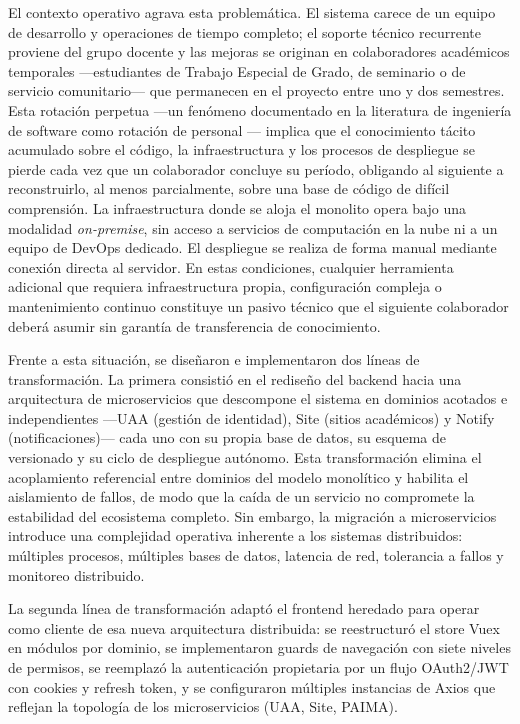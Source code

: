 El contexto operativo agrava esta problem\'{a}tica. El sistema carece de un equipo
de desarrollo y operaciones de tiempo completo; el soporte t\'{e}cnico recurrente
proviene del grupo docente y las mejoras se originan en colaboradores acad\'{e}micos
temporales ---estudiantes de Trabajo Especial de Grado, de seminario o de servicio
comunitario--- que permanecen en el proyecto entre uno y dos semestres. Esta
rotaci\'{o}n perpetua ---un fen\'{o}meno documentado en la literatura de ingenier\'{i}a de
software como rotaci\'{o}n de personal \cite{santos2016jobrotation}--- implica que el
conocimiento t\'{a}cito acumulado sobre el c\'{o}digo, la infraestructura y los procesos
de despliegue se pierde cada vez que un colaborador concluye su per\'{i}odo,
obligando al siguiente a reconstruirlo, al menos parcialmente, sobre una base de c\'{o}digo de
dif\'{i}cil comprensi\'{o}n. La infraestructura donde
se aloja el monolito opera bajo una modalidad \textit{on-premise}, sin acceso a
servicios de computaci\'{o}n en la nube ni a un equipo de DevOps dedicado. El
despliegue se realiza de forma manual mediante conexi\'{o}n directa al servidor. En
estas condiciones, cualquier herramienta adicional que requiera infraestructura
propia, configuraci\'{o}n compleja o mantenimiento continuo constituye un pasivo
t\'{e}cnico que el siguiente colaborador deber\'{a} asumir sin garant\'{i}a de
transferencia de conocimiento.

Frente a esta situaci\'{o}n, se dise\~{n}aron e implementaron dos l\'{i}neas de
transformaci\'{o}n. La primera consisti\'{o} en el redise\~{n}o del backend hacia una
arquitectura de microservicios que descompone el sistema en dominios acotados e
independientes ---UAA (gesti\'{o}n de identidad), Site (sitios acad\'{e}micos) y
Notify (notificaciones)--- cada uno con su propia base de datos, su esquema de
versionado y su ciclo de despliegue aut\'{o}nomo. Esta transformaci\'{o}n elimina el
acoplamiento referencial entre dominios del modelo monol\'{i}tico y habilita el aislamiento de
fallos, de modo que la ca\'{i}da de un servicio no compromete la estabilidad del
ecosistema completo. Sin embargo, la migraci\'{o}n a microservicios introduce una
complejidad operativa inherente a los sistemas distribuidos: m\'{u}ltiples
procesos, m\'{u}ltiples bases de datos, latencia de red, tolerancia a fallos y
monitoreo distribuido.

La segunda l\'{i}nea de transformaci\'{o}n adapt\'{o} el frontend heredado para operar
como cliente de esa nueva arquitectura distribuida: se reestructur\'{o} el store Vuex
en m\'{o}dulos por dominio, se implementaron guards de navegaci\'{o}n con siete niveles
de permisos, se reemplaz\'{o} la autenticaci\'{o}n propietaria por un flujo
OAuth2/JWT con cookies y refresh token, y se configuraron m\'{u}ltiples
instancias de Axios que reflejan la topolog\'{i}a de los microservicios (UAA,
Site, PAIMA).


